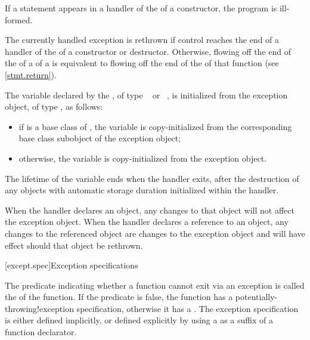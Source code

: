 \pnum
If a  statement appears in a handler of the
of a
constructor, the program is ill-formed.

\pnum
The currently handled exception
is rethrown if control reaches the end of a handler of the
of a constructor or destructor.
Otherwise, flowing off the end of
the 
of a 
of a 
is equivalent to flowing off the end of
the 
of that function (see \ref{stmt.return}).

\pnum
The variable declared by the , of type
\cv{}~ or \cv{}~, is initialized from the exception object,
of type , as follows:
\begin{itemize}
\item
if  is a base class of , the variable is
copy-initialized from the corresponding base class subobject
of the exception object;
\item otherwise, the variable is copy-initialized
from the exception object.
\end{itemize}

The lifetime of the variable ends
when the handler exits, after the
destruction of any objects with automatic storage duration initialized
within the handler.

\pnum
When the handler declares an object,
any changes to that object will not affect the exception object.
When the handler declares a reference to an object,
any changes to the referenced object are changes to the
exception object and will have effect should that object be rethrown.%
%

[except.spec]{Exception specifications}%

\pnum
The predicate indicating whether a function cannot exit via an exception
is called the  of the function.
If the predicate is false,
the function has a
%
%
{potentially-throwing!exception specification},
otherwise it has a
%
.
The exception specification is either defined implicitly,
or defined explicitly
by using a 
as a suffix of a function declarator.

